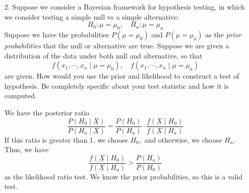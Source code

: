 \documentclass{article}
\begin{document}
\begin{enumerate}
\begin{proof}
			From (1), the LHS is positive, so the RHS is positive as well. Thus, \[E_1[g_c(X)]>E_1[g(X)]\] and since these are Bernoulli random variables, we have
			\begin{align*}
				P_1(g_c(X)=1) &> P_1(g(X)=1) \\
				1-P_1(g_c(X)=0) &> 1-P_1(g(X)=0) \\
				P_1(g(X)=0) &> P_1(g_c(X)=0) \\
				L^1(g) &> L^1(g_c)
			\end{align*}
			as desired.
			
		\end{proof}

	\item[2.] Suppose we consider a Bayesian framework for hypothesis testing, in which we consider testing a simple null vs a simple alternative: \[H_0: \mu=\mu_0, \quad H_a: \mu=\mu_a\] Suppose we have the probabilities $P(\mu=\mu_0)$ and $P(\mu=\mu_a)$ as the \textit{prior probabilities} that the null or alternative are true. Suppose we are given a distribution of the data under both null and alternative, so that \[f(x_1, \cdots, x_n\mid \mu=\mu_0), \quad f(x_1, \cdots, x_n\mid \mu=\mu_a)\] are given. How would you use the prior and likelihood to construct a test of hypothesis. Be completely specific about your test statistic and how it is computed.
		\begin{soln}
			We have the posterior ratio \[\frac{P(H_0\mid \underline{X})}{P(H_a\mid \underline{X})}=\frac{P(H_0)}{P(H_a)}\cdot \frac{f(\underline{X}\mid H_0)}{f(\underline{X}\mid H_a)}\] If this ratio is greater than 1, we choose $H_0,$ and otherwise, we choose $H_a.$ Thus, we have \[\frac{f(\underline{X}\mid H_0)}{f(\underline{X}\mid H_a)}>\frac{P(H_a)}{P(H_0)}\] as the likelihood ratio test. We know the prior probabilities, so this is a valid test.
			
		\end{soln}
		

\end{enumerate}
\end{document}
